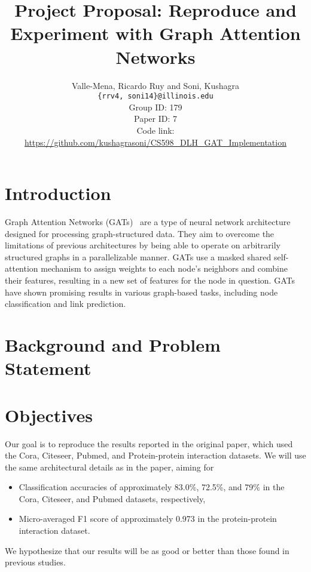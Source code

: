 \documentclass{article}
\title{Project Proposal: Reproduce and Experiment with Graph Attention Networks}
\author
{Valle-Mena, Ricardo Ruy and Soni, Kushagra \\
    \texttt{\{rrv4, soni14\}@illinois.edu}
    \\[2em]
    Group ID: 179\\
    Paper ID: 7\\
    Code link: \url{https://github.com/kushagrasoni/CS598_DLH_GAT_Implementation}
    \\[2em]
}
\begin{document}
    \maketitle

    \section{Introduction}\label{sec:introduction}

    Graph Attention Networks (GATs)~\cite{velickovic2018graph} are a type of neural network architecture designed for
    processing graph-structured data.
    They aim to overcome the limitations of previous architectures by being able to operate on arbitrarily structured graphs in a parallelizable manner.
    GATs use a masked shared self-attention mechanism to assign weights to each node's neighbors and combine their features, resulting in a new set of features for the node in question.
    GATs have shown promising results in various graph-based tasks, including node classification and link prediction.


    \section{Background and Problem Statement}\label{sec:background-and-problem-statement}
    

    \section{Objectives}\label{sec:objectives}
    Our goal is to reproduce the results reported in the original paper, which used the Cora, Citeseer, Pubmed, and Protein-protein interaction datasets.
    We will use the same architectural details as in the paper, aiming for
    \begin{itemize}
        \item Classification accuracies of approximately 83.0\%, 72.5\%, and 79\% in the Cora, Citeseer, and Pubmed
        datasets, respectively,
        \item Micro-averaged F1 score of approximately 0.973 in the protein-protein interaction dataset.
    \end{itemize}
    We hypothesize that our results will be as good or better than those found in previous studies.
\end{document}
